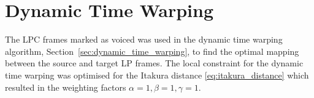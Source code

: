 
\section{Dynamic Time Warping} %
\label{imp:dynamic_time_warping}
The LPC frames marked as voiced was used in the dynamic time warping algorithm, Section~\ref{sec:dynamic_time_warping}, to find the optimal mapping between the source and target LP frames. The local constraint for the dynamic time warping was optimised for the Itakura distance \eqref{eq:itakura_distance} which resulted in the weighting factors $\alpha=1, \beta=1, \gamma=1$.


